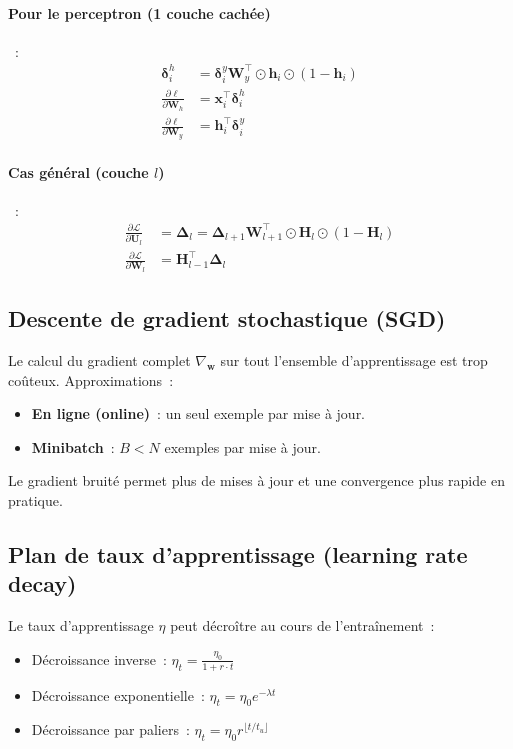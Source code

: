 \documentclass[a4paper,11pt]{article}
\theoremstyle{definition}
\theoremstyle{remark}
\begin{document}
\paragraph{Pour le perceptron (1 couche cach\'ee)}~:
\begin{align}
  \boldsymbol\delta_i^h &= \boldsymbol\delta_i^y \mathbf{W}_y^\intercal
  \odot \mathbf{h}_i \odot (1 - \mathbf{h}_i) \\
  \frac{\partial \ell}{\partial \mathbf{W}_h} &=
  \mathbf{x}_i^\intercal \boldsymbol\delta_i^h \\
  \frac{\partial \ell}{\partial \mathbf{W}_y} &=
  \mathbf{h}_i^\intercal \boldsymbol\delta_i^y
\end{align}

\paragraph{Cas g\'en\'eral (couche $l$)}~:
\begin{align}
  \frac{\partial \mathcal{L}}{\partial \mathbf{U}_l} &=
  \boldsymbol\Delta_l = \boldsymbol\Delta_{l+1} \mathbf{W}_{l+1}^\intercal
  \odot \mathbf{H}_l \odot (1 - \mathbf{H}_l) \\
  \frac{\partial \mathcal{L}}{\partial \mathbf{W}_l} &=
  \mathbf{H}_{l-1}^\intercal \boldsymbol\Delta_l
\end{align}

\subsection{Descente de gradient stochastique (SGD)}

Le calcul du gradient complet $\nabla_{\mathbf{w}}$ sur tout
l'ensemble d'apprentissage est trop co\^uteux. Approximations~:
\begin{itemize}
  \item \textbf{En ligne (online)}~: un seul exemple par mise \`a jour.
  \item \textbf{Minibatch}~: $B < N$ exemples par mise \`a jour.
\end{itemize}
Le gradient bruit\'e permet plus de mises \`a jour et une
convergence plus rapide en pratique.

\subsection{Plan de taux d'apprentissage (learning rate decay)}

Le taux d'apprentissage $\eta$ peut d\'ecro\^itre au cours de
l'entra\^inement~:
\begin{itemize}
  \item D\'ecroissance inverse~: $\eta_t = \frac{\eta_0}{1 + r \cdot t}$
  \item D\'ecroissance exponentielle~: $\eta_t = \eta_0 e^{-\lambda t}$
  \item D\'ecroissance par paliers~: $\eta_t = \eta_0 r^{\lfloor t / t_u \rfloor}$
\end{itemize}
\end{document}

